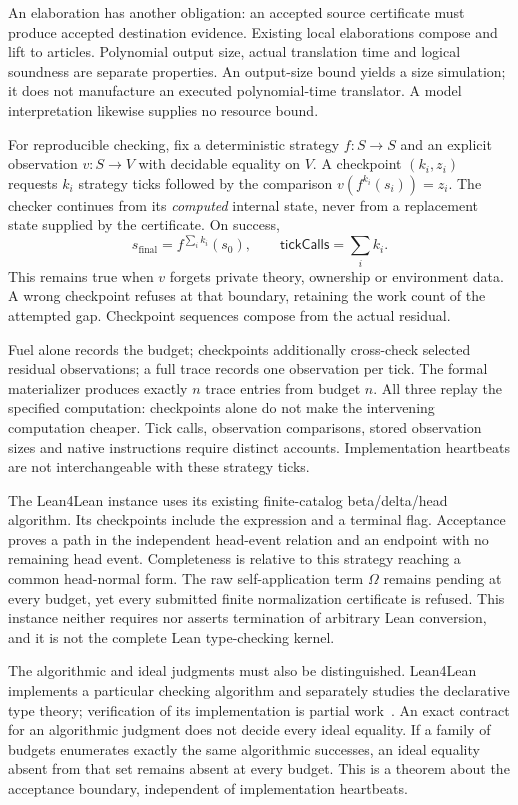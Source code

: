 \documentclass[11pt,a4paper]{article}
\begin{document}
An elaboration has another obligation: an accepted source certificate must
produce accepted destination evidence. Existing local elaborations compose
and lift to articles. Polynomial output size, actual translation time and
logical soundness are separate properties. An output-size bound yields a
size simulation; it does not manufacture an executed polynomial-time
translator. A model interpretation likewise supplies no resource bound.

For reproducible checking, fix a deterministic strategy $f:S\to S$ and an
explicit observation $v:S\to V$ with decidable equality on $V$. A checkpoint
$(k_i,z_i)$ requests $k_i$ strategy ticks followed by the comparison
$v(f^{k_i}(s_i))=z_i$. The checker continues from its \emph{computed} internal
state, never from a replacement state supplied by the certificate. On success,
\[
 s_{\mathrm{final}}=f^{\sum_i k_i}(s_0),\qquad
 \mathsf{tickCalls}=\sum_i k_i.
\]
This remains true when $v$ forgets private theory, ownership or environment
data. A wrong checkpoint refuses at that boundary, retaining the work count
of the attempted gap. Checkpoint sequences compose from the actual residual.

Fuel alone records the budget; checkpoints additionally cross-check selected
residual observations; a full trace records one observation per tick. The
formal materializer produces exactly $n$ trace entries from budget $n$.
All three replay the specified computation: checkpoints alone do not make
the intervening computation cheaper. Tick calls, observation comparisons,
stored observation sizes and native instructions require distinct accounts.
Implementation heartbeats are not interchangeable with these strategy ticks.

The Lean4Lean instance uses its existing finite-catalog beta/delta/head
algorithm. Its checkpoints include the expression and a terminal flag.
Acceptance proves a path in the independent head-event relation and an
endpoint with no remaining head event. Completeness is relative to this
strategy reaching a common head-normal form. The raw self-application term
$\Omega$ remains pending at every budget, yet every submitted finite
normalization certificate is refused. This instance neither requires nor
asserts termination of arbitrary Lean conversion, and it is not the complete
Lean type-checking kernel.

The algorithmic and ideal judgments must also be distinguished. Lean4Lean
implements a particular checking algorithm and separately studies the
declarative type theory; verification of its implementation is partial
work~\cite{Lean4Lean}. An exact contract for an algorithmic judgment does not
decide every ideal equality. If a family of budgets enumerates exactly the
same algorithmic successes, an ideal equality absent from that set remains
absent at every budget. This is a theorem about the acceptance boundary,
independent of implementation heartbeats.
\end{document}

